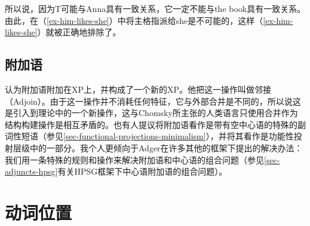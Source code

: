 所以说，因为T可能与Anna具有一致关系，它一定不能与the book具有一致关系。由此，在（\ref{ex-him-likes-she}）中将主格指派给she是不可能的，这样（\ref{ex-him-likes-she}）就被正确地排除了。

\subsection{附加语}

\citet[4.2.3]{Adger2003a}认为附加语附加在XP上，并构成了一个新的XP。他把这一操作叫做邻接（Adjoin）。由于这一操作并不消耗任何特征，它与外部合并是不同的，所以说这是引入到理论中的一个新操作，这与Chomsky所主张的人类语言只使用合并作为结构构建操作是相互矛盾的。也有人提议将附加语看作是带有空中心语的特殊的副词性短语（参见\ref{sec-functional-projections-minimalism}），并将其看作是功能性投射层级中的一部分。我个人更倾向于Adger在许多其他的框架下提出的解决办法：我们用一条特殊的规则和操作来解决附加语和中心语的组合问题（参见\ref{sec-adjuncts-hpsg}有关HPSG框架下中心语附加语的组合问题）。


\section{动词位置}
\label{sec-verb-position-MP}

